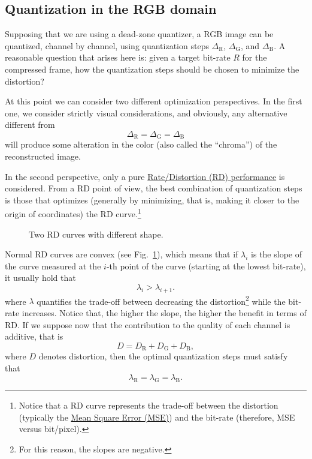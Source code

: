 
\subsection{Quantization in the RGB domain}

Supposing that we are using a dead-zone quantizer, a RGB image
can be quantized, channel by channel, using quantization steps
$\Delta_{\text{R}}$, $\Delta_{\text{G}}$, and $\Delta_{\text{B}}$. A
reasonable question that arises here is: given a target bit-rate $R$
for the compressed frame, how the quantization steps should be chosen
to minimize the distortion?

At this point we can consider two different optimization
perspectives. In the first one, we consider strictly visual
considerations, and obviously, any alternative different from
\begin{equation}
  \Delta_{\text{R}} = \Delta_{\text{G}} = \Delta_{\text{B}}
  \label{eq:simple_Q}
\end{equation}
will produce some alteration in the color (also called the
``chroma'') of the reconstructed image.

In the second perspective, only a pure
\href{https://en.wikipedia.org/wiki/Rate-distortion_theory}{Rate/Distortion
  (RD) performance} is considered. From a RD point of view, the best
combination of quantization steps is those that optimizes (generally
by minimizing, that is, making it closer to the origin of coordinates)
the RD curve.\footnote{Notice that a RD curve represents the trade-off
between the distortion (typically the
\href{https://en.wikipedia.org/wiki/Root-mean-square_deviation}{Mean Square Error (MSE)}) and the bit-rate (therefore, MSE versus
bit/pixel).}

\begin{figure}
  \centering
  \caption{Two RD curves with different shape.}
  \label{fig:RD_slopes}
\end{figure}

Normal RD curves are convex (see Fig.~\ref{fig:RD_slopes}), which
means that if $\lambda_i$ is the slope of the curve measured at the
$i$-th point of the curve (starting at the lowest bit-rate), it
usually hold that
\begin{equation}
  \lambda_i > \lambda_{i+1}.
\end{equation}
where $\lambda$ quantifies the trade-off between decreasing the
distortion\footnote{For this reason, the slopes are negative.} while
the bit-rate increases. Notice that, the higher the slope, the higher
the benefit in terms of RD. If we suppose now that the contribution to
the quality of each channel is additive, that is
\begin{equation}
  D = D_{\text{R}} + D_{\text{G}} + D_{\text{B}},
  \label{eq:additive}
\end{equation}
where $D$ denotes distortion, then the optimal quantization steps must
satisfy that~\cite{vetterli1995wavelets,sayood2017introduction}
\begin{equation}
  \lambda_{\text{R}} = \lambda_{\text{G}} = \lambda_{\text{B}}.
  \label{eq:optimal_quantization}
\end{equation}

